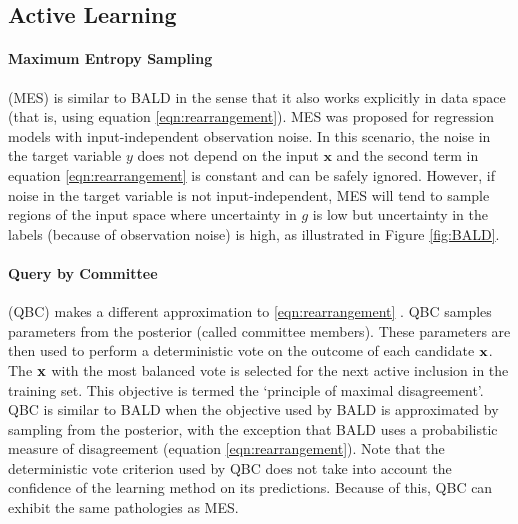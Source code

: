\subsection{Active Learning}

\paragraph{Maximum Entropy Sampling} (MES) \citep{sebastiani2000} is similar to BALD in the sense that it also works explicitly in data space
(that is, using equation \eqref{eqn:rearrangement}). MES was proposed for regression models with input-independent observation noise.
In this scenario, the noise in the target variable $y$ does not depend on the input $\mathbf{x}$ and
the second term in equation \eqref{eqn:rearrangement} is constant and can be safely ignored.
However, if noise in the target variable is not input-independent, MES will tend to sample regions of the input space
where uncertainty in $g$ is low but uncertainty in the labels (because of observation noise) is high,
as illustrated in Figure \ref{fig:BALD}.

\paragraph{Query by Committee} (QBC) makes a different approximation to \eqref{eqn:rearrangement} \citep{freund1997}.
QBC samples parameters from the posterior (called committee members). These parameters are then used to perform a deterministic vote on
the outcome of each candidate $\mathbf{x}$. The $\mathbf{x}$ with the most balanced vote is selected for the next active inclusion in the training set.
This objective is termed the `principle of maximal disagreement'. QBC is similar to
BALD when the objective used by BALD is approximated by sampling from the posterior, with the exception
that BALD uses a probabilistic measure of disagreement (equation \eqref{eqn:rearrangement}).
Note that the deterministic vote criterion used by QBC does not take into account
the confidence of the learning method on its predictions. Because of this, QBC can exhibit the same pathologies as MES.

